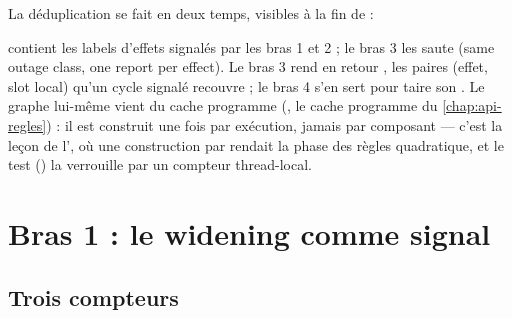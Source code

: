La déduplication se fait en deux temps, visibles à la fin de  :


 contient les labels d'effets signalés par les bras 1 et 2 ; le bras 3 les saute (\og same outage class, one report per effect\fg). Le bras 3 rend en retour , les paires (effet, slot local) qu'un cycle signalé recouvre ; le bras 4 s'en sert pour taire son \Info. Le graphe lui-même vient du cache programme (, le cache programme du \cref{chap:api-regles}) : il est construit une fois par exécution, jamais par composant --- c'est la leçon de l', où une construction par  rendait la phase des règles quadratique, et le test  () la verrouille par un compteur thread-local.

\section{Bras 1 : le widening comme signal}
\label{sec:infinite-loop-point-fixe}

\subsection{Trois compteurs}

